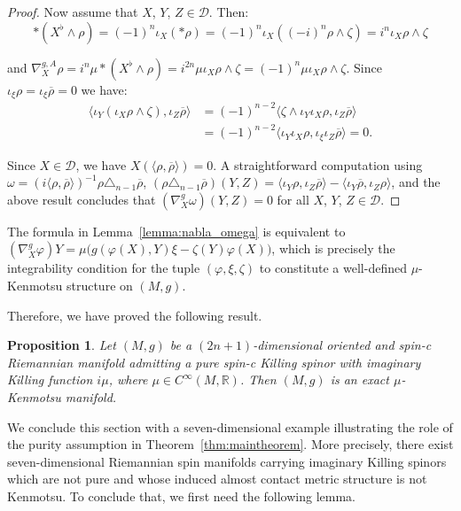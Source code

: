 \documentclass[10pt,a4paper,twoside,reqno]{amsart}
\theoremstyle{plain}
\newtheorem{prop}[thm]{Proposition}
\theoremstyle{definition}
\theoremstyle{remark}
\newcommand{\escal}[1]{\langle#1\rangle}
\begin{document}
\begin{proof}
\noindent
Now assume that $X$, $Y$, $Z\in\mathcal{D}$. Then:
\begin{equation*}
*(X^\flat\wedge\rho)=(-1)^n\iota_X(*\rho)=(-1)^n\iota_X((-i)^n\rho\wedge\zeta) = i^n \iota_X\rho\wedge\zeta
\end{equation*}

\noindent
and $\nabla^{g,A}_X\rho=i^n\mu*(X^\flat\wedge\rho)= i^{2n} \mu\iota_X\rho\wedge\zeta = (-1)^n \mu \iota_X\rho\wedge\zeta$. Since $\iota_{\xi}\rho=\iota_{\xi}\overline{\rho}=0$ we have:
\begin{align*}
\escal{\iota_Y(\iota_X\rho\wedge\zeta),\iota_Z\overline{\rho}}&=(-1)^{n-2}\escal{\zeta\wedge\iota_Y\iota_X\rho,\iota_Z\overline{\rho}}\\
&=(-1)^{n-2}\escal{\iota_Y\iota_X\rho,\iota_\xi\iota_Z\overline{\rho}}=0.
\end{align*}

\noindent
Since $X\in\mathcal{D}$, we have $X(\escal{\rho,\overline{\rho}})=0$. A straightforward computation using $\omega=(i\escal{\rho,\overline{\rho}})^{-1}\rho\triangle_{n-1}\overline{\rho}$, $(\rho\triangle_{n-1}\overline{\rho})(Y,Z)=\escal{\iota_Y\rho,\iota_Z\overline{\rho}}-\escal{\iota_Y\overline{\rho},\iota_Z\rho}$, and the above result concludes that $(\nabla^g_X\omega)(Y,Z)=0$ for all $X$, $Y$, $Z\in\mathcal{D}$.
\end{proof}

The formula in Lemma~\ref{lemma:nabla_omega} is equivalent to $(\nabla^g_X\varphi)Y=\mu\big(g(\varphi(X),Y)\xi-\zeta(Y)\varphi(X)\big)$, which is precisely the integrability condition for the tuple $(\varphi,\xi,\zeta)$ to constitute a well-defined $\mu$-Kenmotsu structure on $(M,g)$.\medskip

Therefore, we have proved the following result.

\begin{prop}
Let $(M,g)$ be a $(2n+1)$-dimensional oriented and spin-c Riemannian manifold admitting a pure spin-c Killing spinor with imaginary Killing function $i\mu$, where $\mu \in C^\infty(M, \mathbb{R})$. Then $(M,g)$ is an exact $\mu$-Kenmotsu manifold.
\end{prop}

We conclude this section with a seven-dimensional example illustrating the role of the purity assumption in Theorem~\ref{thm:maintheorem}. More precisely, there exist seven-dimensional Riemannian spin manifolds carrying imaginary Killing spinors which are not pure and whose induced almost contact metric structure is not Kenmotsu. To conclude that, we first need the following lemma.
\end{document}
